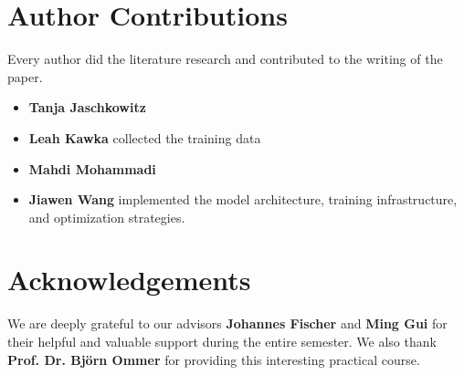 \clearpage
\setcounter{page}{1}
\maketitlesupplementary

\renewcommand{\thesection}{\arabic{section}}

\section{Author Contributions}
\label{sec:author}
Every author did the literature research and contributed to the writing of the paper. 
% 
\begin{itemize}
    \item \textbf{Tanja Jaschkowitz}
    \item \textbf{Leah Kawka} collected the training data
    \item \textbf{Mahdi Mohammadi}
    \item \textbf{Jiawen Wang} implemented the model architecture, training infrastructure, and optimization strategies.
\end{itemize}
% 

\section*{Acknowledgements}

We are deeply grateful to our advisors \textbf{Johannes Fischer} and \textbf{Ming Gui} for their helpful and valuable support during the entire semester. 
We also thank \textbf{Prof. Dr. Björn Ommer} for providing this interesting practical course.
